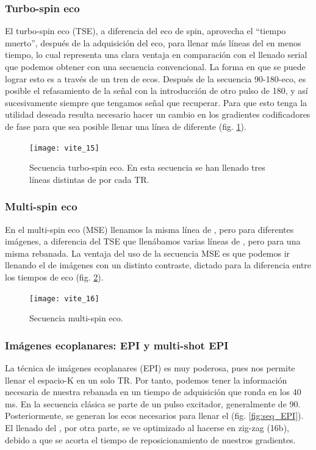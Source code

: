 \subsubsection{Turbo-spin eco}
El turbo-spin eco (TSE), a diferencia del eco de spin, aprovecha el ``tiempo muerto'', después de la adquisición del eco, para llenar más líneas del \espaciok en menos tiempo, lo cual representa una clara ventaja en comparación con el llenado serial que podemos obtener con una secuencia convencional.
La forma en que se puede lograr esto es a través de un tren de ecos. Después de la secuencia 90-180-eco, es posible el refasamiento de la señal con la introducción de otro pulso de 180\degrees, y así sucesivamente siempre que tengamos señal que recuperar. Para que esto tenga la utilidad deseada resulta necesario hacer un cambio en los gradientes codificadores de fase para que sea posible llenar una línea de \espaciok diferente (fig. \ref{fig:seq_TSE}).


\begin{figure}[htb]
\begin{figg}
   \texttt{[image: vite\_15]}
   \caption{Secuencia turbo-spin eco. En esta secuencia se han llenado tres líneas distintas de \espaciok por cada TR.}
 \label{fig:seq_TSE}
 \end{figg}
\end{figure}




\subsubsection{Multi-spin eco}
En el multi-spin eco (MSE) llenamos la misma línea de \espaciok, pero para diferentes imágenes, a diferencia del TSE que llenábamos varias líneas de \espaciok, pero para una misma rebanada.  La ventaja del uso de la secuencia MSE es que podemos ir llenando el \espaciok de imágenes con un distinto contraste, dictado para la diferencia entre los tiempos de eco (fig. \ref{fig:seq_MSE}).



\begin{figure}[htb]
\begin{figg}
   \texttt{[image: vite\_16]}
   \caption{Secuencia multi-spin eco.}
 \label{fig:seq_MSE}
 \end{figg}
\end{figure}



\subsubsection{Imágenes ecoplanares: EPI y multi-shot EPI}
La técnica de imágenes ecoplanares (EPI) es muy poderosa, pues nos permite llenar el espacio-K en un solo TR. Por tanto, podemos tener la información necesaria de nuestra rebanada en un tiempo de adquisición que ronda en los 40 ms.  En la secuencia clásica se parte de un pulso excitador, generalmente de 90. Posteriormente, se generan los ecos necesarios para llenar el \espaciok (fig. \ref{fig:seq_EPI}). El llenado del \espaciok, por otra parte, se ve optimizado al hacerse en zig-zag (16b), debido a que se acorta el tiempo de reposicionamiento de nuestros gradientes. 

